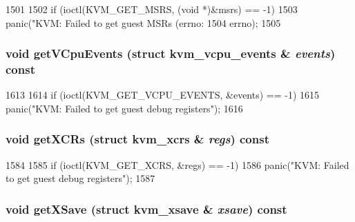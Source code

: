 \begin{DoxyCode}
1501 {
1502     if (ioctl(KVM_GET_MSRS, (void *)&msrs) == -1)
1503         panic("KVM: Failed to get guest MSRs (errno: %
1504               errno);
1505 }
\end{DoxyCode}
\hypertarget{classX86KvmCPU_a7c08fc9f9ab36f8eda2a3cfe6c234635}{
\subsubsection[{getVCpuEvents}]{\setlength{\rightskip}{0pt plus 5cm}void getVCpuEvents (struct kvm\_\-vcpu\_\-events \& {\em events}) const}}
\label{classX86KvmCPU_a7c08fc9f9ab36f8eda2a3cfe6c234635}



\begin{DoxyCode}
1613 {
1614     if (ioctl(KVM_GET_VCPU_EVENTS, &events) == -1)
1615         panic("KVM: Failed to get guest debug registers\n");
1616 }
\end{DoxyCode}
\hypertarget{classX86KvmCPU_a6744a04655bbdcee8aa24919573d8698}{
\subsubsection[{getXCRs}]{\setlength{\rightskip}{0pt plus 5cm}void getXCRs (struct kvm\_\-xcrs \& {\em regs}) const}}
\label{classX86KvmCPU_a6744a04655bbdcee8aa24919573d8698}



\begin{DoxyCode}
1584 {
1585     if (ioctl(KVM_GET_XCRS, &regs) == -1)
1586         panic("KVM: Failed to get guest debug registers\n");
1587 }
\end{DoxyCode}
\hypertarget{classX86KvmCPU_af9f89d561ce9170ad89e6582071c1169}{
\subsubsection[{getXSave}]{\setlength{\rightskip}{0pt plus 5cm}void getXSave (struct kvm\_\-xsave \& {\em xsave}) const}}
\label{classX86KvmCPU_af9f89d561ce9170ad89e6582071c1169}



